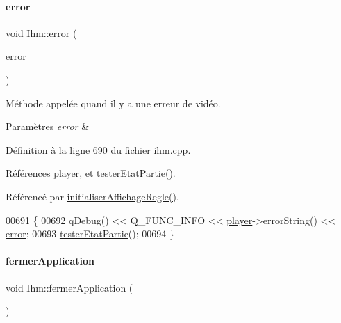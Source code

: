 \paragraph{\texorpdfstring{error}{error}}
{\footnotesize\ttfamily void Ihm\+::error (\begin{DoxyParamCaption}\item[{Q\+Media\+Player\+::\+Error}]{error }\end{DoxyParamCaption})\hspace{0.3cm}{\ttfamily [slot]}}



Méthode appelée quand il y a une erreur de vidéo. 


\begin{DoxyParams}{Paramètres}
{\em error} & \\
\hline
\end{DoxyParams}


Définition à la ligne \hyperlink{ihm_8cpp_source_l00690}{690} du fichier \hyperlink{ihm_8cpp_source}{ihm.\+cpp}.



Références \hyperlink{ihm_8h_source_l00064}{player}, et \hyperlink{ihm_8cpp_source_l00641}{tester\+Etat\+Partie()}.



Référencé par \hyperlink{ihm_8cpp_source_l00605}{initialiser\+Affichage\+Regle()}.


\begin{DoxyCode}
00691 \{
00692     qDebug() << Q\_FUNC\_INFO << \hyperlink{class_ihm_a633230fb15d587e647ad9d2d6142ebc3}{player}->errorString() << \hyperlink{class_ihm_a28b5dd043c4d752bb944110d8d8457aa}{error};
00693     \hyperlink{class_ihm_a8dbd08db43f7c80ca7266cc6b162f571}{testerEtatPartie}();
00694 \}
\end{DoxyCode}
\mbox{\label{class_ihm_a703fa568eb3a2fb7f912decad222817e}} 
\paragraph{\texorpdfstring{fermer\+Application}{fermerApplication}}
{\footnotesize\ttfamily void Ihm\+::fermer\+Application (\begin{DoxyParamCaption}{ }\end{DoxyParamCaption})\hspace{0.3cm}{\ttfamily [slot]}}



